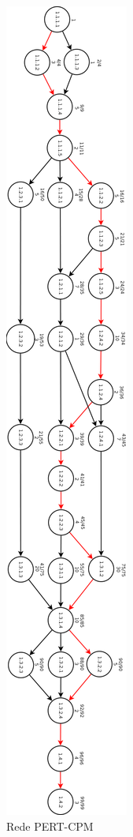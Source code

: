 \documentclass[a4paper,11pt]{article}
\begin{document}
    	\begin{figure}[!H]
    		\centering
        	\includegraphics[width=\textwidth,height=\dimexpr\textheight-3\baselineskip\relax,keepaspectratio]{engsoft_pert2.png}
        	\caption{Rede PERT-CPM}
     		\label{PERT}
    	\end{figure}
\end{document}
